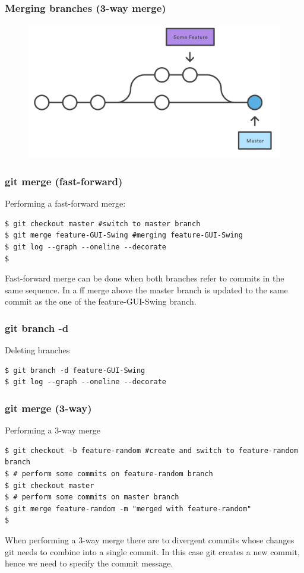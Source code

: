 \documentclass{beamer}
\begin{document}
\begin{frame}
\frametitle{Merging branches (3-way merge)}

\begin{figure}
\includegraphics[scale=0.8]{figures/f16.png}
\end{figure}

\end{frame}

\begin{frame}[fragile]
\frametitle{git merge (fast-forward)}

Performing a fast-forward merge:

\begin{lstlisting}
$ git checkout master #switch to master branch
$ git merge feature-GUI-Swing #merging feature-GUI-Swing
$ git log --graph --oneline --decorate 
$ 
\end{lstlisting}

Fast-forward merge can be done when both branches refer to commits in
the same sequence. In a ff merge above the master branch is updated to
the same commit as the one of the feature-GUI-Swing branch.

\end{frame}

\begin{frame}[fragile]
\frametitle{git branch -d}

Deleting branches

\begin{lstlisting}
$ git branch -d feature-GUI-Swing
$ git log --graph --oneline --decorate
\end{lstlisting}
\end{frame}


\begin{frame}[fragile]
\frametitle{git merge (3-way)}

Performing a 3-way merge

\begin{lstlisting}
$ git checkout -b feature-random #create and switch to feature-random branch
$ # perform some commits on feature-random branch
$ git checkout master
$ # perform some commits on master branch
$ git merge feature-random -m "merged with feature-random"
$ 
\end{lstlisting}

When performing a 3-way merge there are to divergent commits whose
changes git needs to combine into a single commit. In this case git
creates a new commit, hence we need to specify the commit message.
\end{frame}
\end{document}
